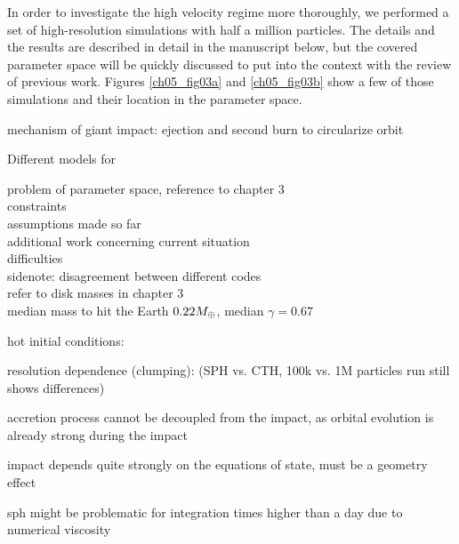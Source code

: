 In order to investigate the high velocity regime more thoroughly, we performed a set of high-resolution simulations with half a million particles. The details and the results are described in detail in the manuscript below, but the covered parameter space will be quickly discussed to put into the context with the review of previous work. Figures \ref{ch05_fig03a} and \ref{ch05_fig03b} show a few of those simulations and their location in the parameter space.


mechanism of giant impact: ejection and second burn to circularize orbit

Different models for 

problem of parameter space, reference to chapter 3\\
constraints\\
assumptions made so far\\

additional work concerning
current situation\\

difficulties\\

sidenote: disagreement between different codes\\


refer to disk masses in chapter 3\\


\cite{Chambers:2001p2105}
median mass to hit the Earth $0.22 M_{\oplus}$, median $\gamma = 0.67$



hot initial conditions:
\citep{2000orem.book..179P}

resolution dependence (clumping):
\citep{Canup:2010p3713} (SPH vs. CTH, 100k vs. 1M particles run still shows differences)

accretion process cannot be decoupled from the impact, as orbital evolution is already strong during the impact 

impact depends quite strongly on the equations of state, must be a geometry effect

sph might be problematic for integration times higher than a day due to numerical viscosity \citep{Canup:2004p115} 


